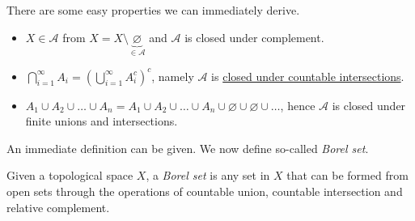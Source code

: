 \begin{remark}
	There are some easy properties we can immediately derive.
	\begin{itemize}
		\item \(X\in \mathcal{A} \) from \(X = X\setminus \underbrace{\varnothing}_{\in \mathcal{A}} \) and \(\mathcal{A}\) is closed under complement.
		\item \(\bigcap\limits_{i=1}^{\infty} A_{i} = \left(\bigcup\limits_{i=1}^{\infty} A_{i}^{c} \right)^c\), namely \(\mathcal{A} \) is \underline{closed under countable intersections}.
		\item \(A_1\cup A_2 \cup \ldots \cup A_n = A_1\cup A_2 \cup \ldots \cup A_n \cup \varnothing \cup \varnothing \cup\ldots\), hence \(\mathcal{A} \) is closed under finite unions and intersections.
	\end{itemize}
\end{remark}

An immediate definition can be given. We now define so-called \emph{Borel set}.
\begin{definition}\label{def:Borel-set}
	Given a topological space \(X\), a \emph{Borel set} is any set in \(X\) that can be formed from open sets through the operations of countable union, countable intersection and relative complement.
\end{definition}